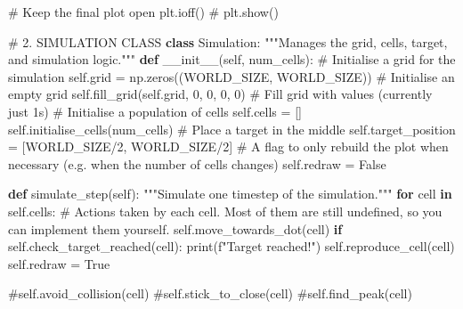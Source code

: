 \documentclass[
  letterpaper,
  DIV=11,
  numbers=noendperiod]{scrreprt}
\newenvironment{Shaded}{\begin{snugshade}}{\end{snugshade}}
\newcommand{\BuiltInTok}[1]{\textcolor[rgb]{0.00,0.23,0.31}{#1}}
\newcommand{\CommentTok}[1]{\textcolor[rgb]{0.37,0.37,0.37}{#1}}
\newcommand{\ControlFlowTok}[1]{\textcolor[rgb]{0.00,0.23,0.31}{\textbf{#1}}}
\newcommand{\DecValTok}[1]{\textcolor[rgb]{0.68,0.00,0.00}{#1}}
\newcommand{\FunctionTok}[1]{\textcolor[rgb]{0.28,0.35,0.67}{#1}}
\newcommand{\KeywordTok}[1]{\textcolor[rgb]{0.00,0.23,0.31}{\textbf{#1}}}
\newcommand{\NormalTok}[1]{\textcolor[rgb]{0.00,0.23,0.31}{#1}}
\newcommand{\OperatorTok}[1]{\textcolor[rgb]{0.37,0.37,0.37}{#1}}
\newcommand{\SpecialStringTok}[1]{\textcolor[rgb]{0.13,0.47,0.30}{#1}}
\newcommand{\VariableTok}[1]{\textcolor[rgb]{0.07,0.07,0.07}{#1}}
\theoremstyle{definition}
\theoremstyle{remark}
\begin{document}
\begin{tcolorbox}
\begin{Shaded}
\begin{Highlighting}[]
    \CommentTok{\# Keep the final plot open}
\NormalTok{    plt.ioff()}
    \CommentTok{\# plt.show()}



\CommentTok{\# 2. SIMULATION CLASS}
\KeywordTok{class}\NormalTok{ Simulation:}
    \CommentTok{"""Manages the grid, cells, target, and simulation logic."""}
    \KeywordTok{def} \FunctionTok{\_\_init\_\_}\NormalTok{(}\VariableTok{self}\NormalTok{, num\_cells):}
        \CommentTok{\# Initialise a grid for the simulation}
        \VariableTok{self}\NormalTok{.grid }\OperatorTok{=}\NormalTok{ np.zeros((WORLD\_SIZE, WORLD\_SIZE))  }\CommentTok{\# Initialise an empty grid}
        \VariableTok{self}\NormalTok{.fill\_grid(}\VariableTok{self}\NormalTok{.grid, }\DecValTok{0}\NormalTok{, }\DecValTok{0}\NormalTok{, }\DecValTok{0}\NormalTok{, }\DecValTok{0}\NormalTok{)           }\CommentTok{\# Fill grid with values (currently just 1s)}
        \CommentTok{\# Initialise a population of cells}
        \VariableTok{self}\NormalTok{.cells }\OperatorTok{=}\NormalTok{ []}
        \VariableTok{self}\NormalTok{.initialise\_cells(num\_cells)}
        \CommentTok{\# Place a \textquotesingle{}target\textquotesingle{} in the middle}
        \VariableTok{self}\NormalTok{.target\_position }\OperatorTok{=}\NormalTok{ [WORLD\_SIZE}\OperatorTok{/}\DecValTok{2}\NormalTok{, WORLD\_SIZE}\OperatorTok{/}\DecValTok{2}\NormalTok{] }
        \CommentTok{\# A flag to only rebuild the plot when necessary (e.g. when the number of cells changes)}
        \VariableTok{self}\NormalTok{.redraw }\OperatorTok{=} \VariableTok{False}

    \KeywordTok{def}\NormalTok{ simulate\_step(}\VariableTok{self}\NormalTok{):}
        \CommentTok{"""Simulate one timestep of the simulation."""}
        \ControlFlowTok{for}\NormalTok{ cell }\KeywordTok{in} \VariableTok{self}\NormalTok{.cells:}
            \CommentTok{\# Actions taken by each cell. Most of them are still undefined, so you can implement them yourself.}
            \VariableTok{self}\NormalTok{.move\_towards\_dot(cell)  }
            \ControlFlowTok{if} \VariableTok{self}\NormalTok{.check\_target\_reached(cell):}
                \BuiltInTok{print}\NormalTok{(}\SpecialStringTok{f"Target reached!"}\NormalTok{)}
                \VariableTok{self}\NormalTok{.reproduce\_cell(cell)}
                \VariableTok{self}\NormalTok{.redraw }\OperatorTok{=} \VariableTok{True}
            
            \CommentTok{\#self.avoid\_collision(cell)}
            \CommentTok{\#self.stick\_to\_close(cell)}
            \CommentTok{\#self.find\_peak(cell)}


\end{Highlighting}
\end{Shaded}
\end{tcolorbox}
\end{document}
